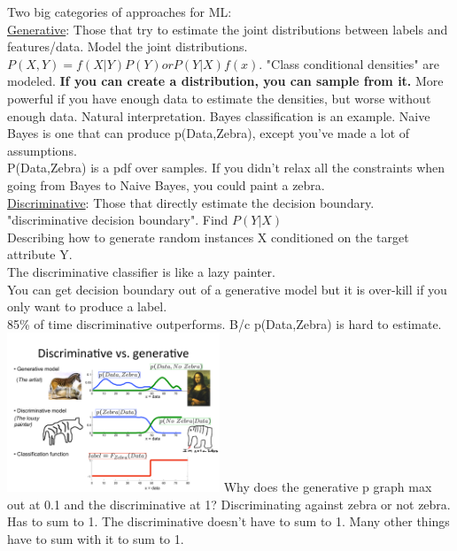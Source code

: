 Two big categories of approaches for ML: \hfill \\
\underline{Generative}:
		Those that try to estimate the joint distributions between labels and features/data. 
		Model the joint distributions. $P(X,Y) = f(X|Y) P(Y) or P(Y|X)f(x)$.  
		"Class conditional densities" are modeled.  %
		\textbf{If you can create a distribution, you can sample from it.}  %
		More powerful if you have enough data to estimate the densities, but worse without enough data.
		Natural interpretation.  
		Bayes classification is an example.    
		Naive Bayes is one that can produce p(Data,Zebra), except you've made a lot of assumptions.   \hfill \\  %
		P(Data,Zebra) is a pdf over samples. 
		If you didn't relax all the constraints when going from Bayes to Naive Bayes, you could paint a zebra. 
 \hfill \\
\underline{Discriminative}:
		Those that directly estimate the decision boundary.  "discriminative decision boundary".  Find $P(Y|X)$ \hfill \\
		Describing how to generate random instances X conditioned on the target attribute Y.  \hfill \\
		 The discriminative classifier is like a lazy painter.  \hfill \\  %
		 You can get decision boundary out of a generative model but it is over-kill if you only want to produce a label.  \hfill \\  %
		 85\% of time discriminative outperforms.  B/c p(Data,Zebra) is hard to estimate.  \hfill \\  %
		 
\includegraphics[width=2.5in]{figures/zebra_painting.pdf}
Why does the generative p graph max out at 0.1 and the discriminative at 1?   
    Discriminating against zebra or not zebra.  Has to sum to 1.  
    The discriminative doesn't have to sum to 1.  Many other things have to sum with it to sum to 1. 
		

